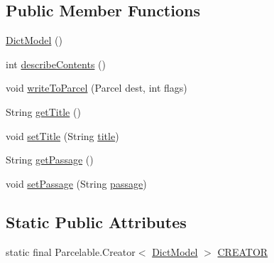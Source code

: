 \subsection*{Public Member Functions}
\begin{DoxyCompactItemize}
\item 
\hyperlink{classorg_1_1buildmlearn_1_1toolkit_1_1dictationtemplate_1_1data_1_1DictModel_a5a08c320a4378d22fb4d19d6cbfc4bac}{Dict\+Model} ()
\item 
int \hyperlink{classorg_1_1buildmlearn_1_1toolkit_1_1dictationtemplate_1_1data_1_1DictModel_ac6d74afec1acdfa09114110983f89078}{describe\+Contents} ()
\item 
void \hyperlink{classorg_1_1buildmlearn_1_1toolkit_1_1dictationtemplate_1_1data_1_1DictModel_a55d0dd1a08119c9ba1292bbb846a2a49}{write\+To\+Parcel} (Parcel dest, int flags)
\item 
String \hyperlink{classorg_1_1buildmlearn_1_1toolkit_1_1dictationtemplate_1_1data_1_1DictModel_a3c4ff3eb49d8e40db1defa3025656615}{get\+Title} ()
\item 
void \hyperlink{classorg_1_1buildmlearn_1_1toolkit_1_1dictationtemplate_1_1data_1_1DictModel_a8e66143c74427d9e97d5a82655b4f1fc}{set\+Title} (String \hyperlink{classorg_1_1buildmlearn_1_1toolkit_1_1dictationtemplate_1_1data_1_1DictModel_a300553726072e08510965b54ece05b27}{title})
\item 
String \hyperlink{classorg_1_1buildmlearn_1_1toolkit_1_1dictationtemplate_1_1data_1_1DictModel_a33d60e1a23059c44f23406c4d8aac45b}{get\+Passage} ()
\item 
void \hyperlink{classorg_1_1buildmlearn_1_1toolkit_1_1dictationtemplate_1_1data_1_1DictModel_a88cbd01e66cf690ea2f5e59a361e5e70}{set\+Passage} (String \hyperlink{classorg_1_1buildmlearn_1_1toolkit_1_1dictationtemplate_1_1data_1_1DictModel_a93b0e1d530db77c590937a971d75697c}{passage})
\end{DoxyCompactItemize}
\subsection*{Static Public Attributes}
\begin{DoxyCompactItemize}
\item 
static final Parcelable.\+Creator$<$ \hyperlink{classorg_1_1buildmlearn_1_1toolkit_1_1dictationtemplate_1_1data_1_1DictModel}{Dict\+Model} $>$ \hyperlink{classorg_1_1buildmlearn_1_1toolkit_1_1dictationtemplate_1_1data_1_1DictModel_a93129740b23b9a459d90aecdb118b8dd}{C\+R\+E\+A\+T\+OR}
\end{DoxyCompactItemize}
